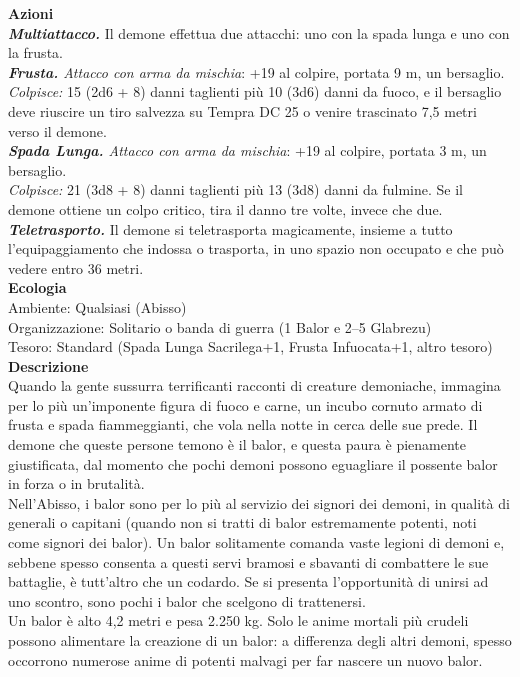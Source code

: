 \begin{multicols}{2}
\smallskip\textbf{Azioni}\\
\emph{\textbf{Multiattacco.}} Il demone effettua due attacchi: uno con la spada lunga e uno con la frusta.\\
\emph{\textbf{Frusta.} Attacco con arma da mischia}: +19 al colpire, portata 9 m, un bersaglio.\\
\emph{Colpisce:} 15 (2d6 + 8) danni taglienti più 10 (3d6) danni da fuoco, e il bersaglio deve riuscire un tiro salvezza su Tempra DC  25 o venire trascinato 7,5 metri verso il demone.\\
\emph{\textbf{Spada Lunga.} Attacco con arma da mischia}: +19 al colpire, portata 3 m, un bersaglio.\\
\emph{Colpisce:} 21 (3d8 + 8) danni taglienti più 13 (3d8) danni da fulmine. Se il demone ottiene un colpo critico, tira il danno tre volte, invece che due.\\
\emph{\textbf{Teletrasporto.}} Il demone si teletrasporta magicamente, insieme a tutto l'equipaggiamento che indossa o trasporta, in uno spazio non occupato e che può vedere entro 36 metri.\\
\textbf{Ecologia}\\
Ambiente: Qualsiasi (Abisso)\\
Organizzazione: Solitario o banda di guerra (1 Balor e 2–5 Glabrezu)\\
Tesoro: Standard (Spada Lunga Sacrilega+1, Frusta Infuocata+1, altro tesoro)\\
\textbf{Descrizione}\\
Quando la gente sussurra terrificanti racconti di creature demoniache, immagina per lo più un'imponente figura di fuoco e carne, un incubo cornuto armato di frusta e spada fiammeggianti, che vola nella notte in cerca delle sue prede. Il demone che queste persone temono è il balor, e questa paura è pienamente giustificata, dal momento che pochi demoni possono eguagliare il possente balor in forza o in brutalità.\\
Nell'Abisso, i balor sono per lo più al servizio dei signori dei demoni, in qualità di generali o capitani (quando non si tratti di balor estremamente potenti, noti come signori dei balor). Un balor solitamente comanda vaste legioni di demoni e, sebbene spesso consenta a questi servi bramosi e sbavanti di combattere le sue battaglie, è tutt’altro che un codardo. Se si presenta l'opportunità di unirsi ad uno scontro, sono pochi i balor che scelgono di trattenersi.\\
Un balor è alto 4,2 metri e pesa 2.250 kg. Solo le anime mortali più crudeli possono alimentare la creazione di un balor: a differenza degli altri demoni, spesso occorrono numerose anime di potenti malvagi per far nascere un nuovo balor.\\


\end{multicols}
